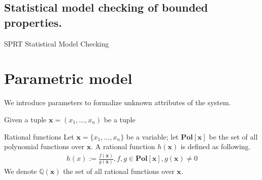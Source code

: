 \subsection{Statistical model checking of bounded properties.}

\begin{algorithm}[H]
    \caption{SPRT Statistical Model Checking}
    \label{alg:smc-sprt}
    \begin{algorithmic}[1]
        \EndProcedure
    \end{algorithmic}
\end{algorithm}

\section{Parametric model}
We introduce parameters to formalize unknown attributes of the system.
\begin{definition}
    Given a tuple $\mathbf{x}=(x_1,\ldots,x_n)$ be a tuple
\end{definition}

\begin{definition}{Rational functions}
    Let $\mathbf{x}=\{x_1,\ldots,x_n\}$ be a variable; let $\mathbf{Pol}[\mathbf{x}]$ be the set of
    all polynomial functions over $\mathbf{x}$. A rational function $h(\mathbf{x})$ is defined
    as following.
    \begin{align*}
        h(x) := \frac{f(\mathbf{x})}{g(\mathbf{x})}, f,g\in\mathbf{Pol}[\mathbf{x}], g(\mathbf{x}) \neq 0
    \end{align*}
    We denote $\mathbb{Q}(\mathbf{x})$ the set of all rational functions over $\mathbf{x}$.
\end{definition}


